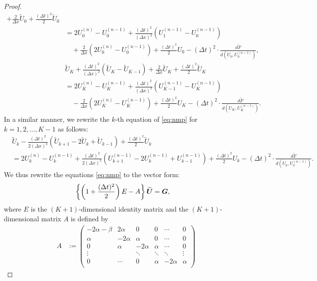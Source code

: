 \documentclass[dvipdfmx-if-dvi,autodetect-engine,ja=standard]{amsart}
\numberwithin{equation}{section} %
\def\vect#1{\mbox{\boldmath $#1$}} %
\begin{document}
\begin{proof}
\begin{align*}
    + \frac{2}{\Delta x} \widetilde{U}_0 + \frac{(\Delta t)^2}{2} \widetilde{U}_0 \\
    &=
    2 U_0^{(n)} -  U_0^{(n-1)} + \frac{(\Delta t)^2}{(\Delta x)^2} (U_1^{(n-1)} - U_0^{(n-1)}) \\
    &\quad
    + \frac{2}{\Delta x} (2 U_0^{(n)} -  U_0^{(n-1)}) + \frac{(\Delta t)^2}{2} U_0 
    - (\Delta t)^2 \cdot \frac{d \tilde{F}}{d(U_0, U_0^{(n-1)})},\\
    &\widetilde{U}_K + \frac{(\Delta t)^2}{(\Delta x)^2} (\widetilde{U}_K - \widetilde{U}_{K-1})
    + \frac{2}{\Delta x} \widetilde{U}_K + \frac{(\Delta t)^2}{2} \widetilde{U}_K \\
    &=
    2 U_K^{(n)} -  U_K^{(n-1)} + \frac{(\Delta t)^2}{(\Delta x)^2} (U_{K-1}^{(n-1)} - U_K^{(n-1)}) \\
    &\quad
    - \frac{2}{\Delta x} (2 U_K^{(n)} -  U_K^{(n-1)}) + \frac{(\Delta t)^2}{2} U_K
    - (\Delta t)^2 \cdot \frac{d \tilde{F}}{d(U_K, U_K^{(n-1)})}.
\end{align*}
In a similar manner, we rewrite the $k$-th equation of \eqref{eq:nmp} for $k=1,2,\ldots, K-1$ as follows: 
\begin{align*}
&\widetilde{U}_k - \frac{(\Delta t)^2}{2  (\Delta x)^2} (\widetilde{U}_{k+1} -  2\widetilde{U}_k + \widetilde{U}_{k-1}) + \frac{(\Delta t)^2}{2} \widetilde{U}_k \\
&= 2 U_k^{(n)} -  U_k^{(n-1)} + \frac{(\Delta t)^2}{2  (\Delta x)^2} (U_{k+1}^{(n-1)} -  2U_k^{(n-1)} + U_{k-1}^{(n-1)}) + \frac{(\Delta t)^2}{2} U_k
    - (\Delta t)^2 \cdot \frac{d \tilde{F}}{d(U_k, U_k^{(n-1)})}.
\end{align*}
We thus rewrite the equations \eqref{eq:nmp}
to the vector form: 
\begin{align}\label{eq:scheme:vec}
    \left\{ \left(1 + \frac{(\Delta t)^2}{2} \right) E - A\right\} \widetilde{\vect{U}}
    &= \vect{G}, 
\end{align}
where $E$ is
the $(K+1)$-dimensional identity matrix and the $(K+1)$-dimensional matrix $A$ is defined by 
\begin{align}
    A &:=
    \begin{pmatrix}
    -2 \alpha - \beta & 2 \alpha & 0 &0 &\cdots & 0\\
    \alpha & - 2 \alpha & \alpha & 0 &\cdots & 0\\
    0 &\alpha &-2 \alpha &\alpha & \cdots & 0\\
    \vdots &\ &\ddots&\ddots &\ddots &\vdots \\
    0&\cdots &0 &\alpha &-2 \alpha &\alpha \\

\end{pmatrix}
\end{align}
\end{proof}
\end{document}
